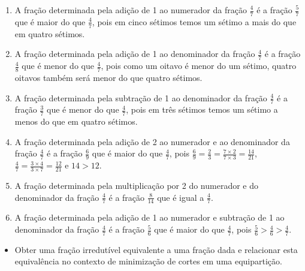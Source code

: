 \begin{solucao}{}{}


\begin{enumerate} [\quad a)] %
    \item       A fração determinada pela adição de 1 ao numerador da fração
  $\frac{4}{7}$       é a fração       $\frac{5}{7}$       que é maior do que
   $\frac{4}{7}$, pois em cinco sétimos temos um sétimo a mais do que em quatro
sétimos.


\newpage
    \item       A fração determinada pela adição de 1 ao denominador da fração
    $\frac{4}{7}$       é a fração       $\frac{4}{8}$       que é menor do que
     $\frac{4}{7}$, pois como um oitavo é menor do um sétimo, quatro oitavos
também será menor do que quatro sétimos.
    \item       A fração determinada pela subtração de 1 ao denominador da
fração       $\frac{4}{7}$       é a fração       $\frac{3}{7}$       que é
menor do que       $\frac{4}{7}$, pois em três sétimos temos um sétimo a menos
do que em quatro sétimos.
    \item       A fração determinada pela adição de 2 ao numerador e ao
denominador da fração       $\frac{4}{7}$       é a fração       $\frac{6}{9}$
    que é maior do que       $\frac{4}{7}$, pois       $\frac{6}{9} =
\frac{2}{3} = \frac{7 \times 2}{7 \times 3} = \frac{14}{21}$,       $\frac{4}{7}
= \frac{3 \times 4}{3 \times 7} = \frac{12}{21}$       e       $14 > 12$.
    \item       A fração determinada pela multiplicação por 2 do numerador e do
denominador da fração       $\frac{4}{7}$       é a fração       $\frac{8}{14}$
     que é igual a       $\frac{4}{7}$.
    \item       A fração determinada pela adição de 1 ao numerador e subtração
de 1 ao denominador da fração       $\frac{4}{7}$       é a fração
$\frac{5}{6}$       que é maior do que       $\frac{4}{7}$, pois
$\frac{5}{6} > \frac{4}{6} > \frac{4}{7}$.
\end{enumerate} %

\end{solucao}

\clearpage

\begin{objetivos}[label=chap4-ativ16]{}{}
\begin{itemize} %
    \item       Obter uma fração irredutível equivalente a uma fração dada e
relacionar esta equivalência no contexto de minimização de cortes em uma
equipartição.
\end{itemize} %
\end{objetivos}

